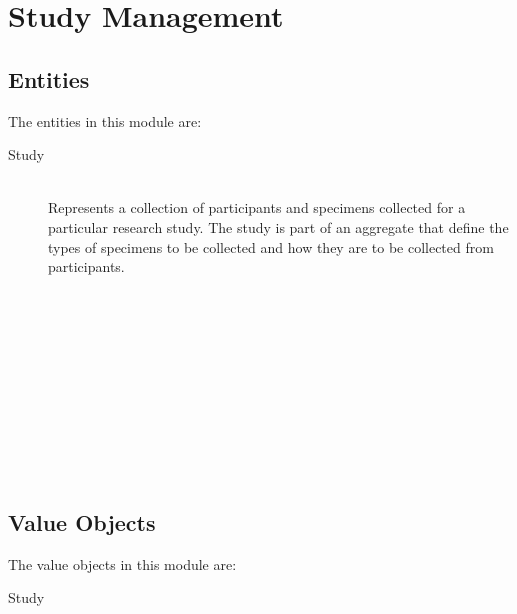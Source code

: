 \chapter{Study Management}

\section{Entities}

The entities in this module are:

\begin{description}

  \item[Study] \hfill \\
    Represents a collection of participants and specimens collected for a
    particular research study. The study is part of an aggregate that define
    the types of specimens to be collected and how they are to be collected
    from participants.

  \item[] \hfill \\

  \item[] \hfill \\

  \item[] \hfill \\

  \item[] \hfill \\

  \item[] \hfill \\

  \item[] \hfill \\


\end{description}

\section{Value Objects}

The value objects in this module are:

\begin{description}

  \item[Study] \hfill \\

  \item[] \hfill \\

  \item[] \hfill \\

  \item[] \hfill \\

  \item[] \hfill \\

  \item[] \hfill \\

  \item[] \hfill \\


\end{description}

